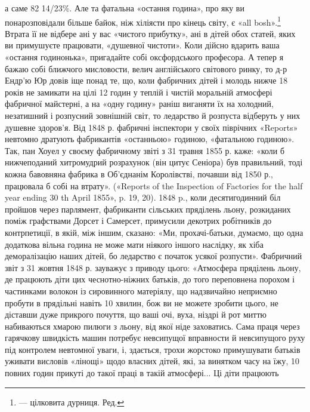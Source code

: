 а саме 82 14/23\%. Але та фатальна «остання година», про яку ви понарозповідали більше байок, ніж
хіліясти про кінець світу, є «all bosh».\footnote*{
— цілковита дурниця. Ред.
} Втрата її не відбере ані у вас «чистого прибутку», ані в
дітей обох статей, яких ви примушуєте працювати, «душевної чистоти».
Коли дійсно вдарить ваша «остання годинонька», пригадайте собі оксфордського професора. А тепер я
бажаю собі ближчого мисловости, велич англійського світового ринку, то д-р Ендр’ю Юр довів іще понад
те, що, коли фабричних дітей і молодь нижче 18 років не замикати
на цілі 12 годин у теплій і чистій моральній атмосфері фабричної майстерні, а на «одну годину» раніш
виганяти їх на холодний, незатишний і розпусний зовнішній світ, то ледарство й розпуста відберуть у
них душевне здоров’я. Від 1848 р. фабричні інспектори у своїх піврічних «Reports»
невтомно дратують фабрикантів «останньою» годиною, «фатальною
годиною». Так, пан Хоуел у своєму фабричному звіті з 31 травня 1855 р.
каже: «коли б нижчеподаний хитромудрий розрахунок (він цитує Сеніора) був правильний, тоді кожна
бавовняна фабрика в Об’єднанім Королівстві, почавши від 1850 р., працювала б собі на втрату».
(«Reports of
the Inspection of Factories for the half year ending 30 th April 1855», p. 19, 20). 1848 p., коли
десятигодинний біл пройшов через парлямент, фабриканти сільських пряділень льону, розкиданих поміж
графствами Дорсет і Самерсет, примусили декотрих робітників до контрпетиції, в якій, між іншим,
сказано: «Ми, прохачі-батьки, думаємо, що одна додаткова
вільна година не може мати ніякого іншого наслідку, як хіба деморалізацію наших дітей, бо ледарство
є початок усякої розпусти». Фабричний звіт з 31 жовтня 1848 р. зауважує з приводу цього: «Атмосфера
пряділень льону, де працюють діти цих чеснотно-ніжних батьків, до того переповнена порохом і
частинками волокон із сировинного матеріялу, що
надзвичайно неприємно пробути в прядільні навіть 10 хвилин, бож ви не
можете зробити цього, не діставши дуже прикрого почуття, що ваші очі, вуха, ніздрі й рот миттю
набиваються хмарою пилюги з льону, від якої ніде заховатись. Сама праця через гарячкову швидкість
машин потребує
невсипущої вправности й невсипущого руху під контролем невтомної уваги, і, здається, трохи жорстоко
примушувати батьків уживати висловів «лінощі» щодо власних дітей, які, за винятком часу на їжу, 10
повних годин прикуті до такої праці в такій атмосфері... Ці діти працюють
